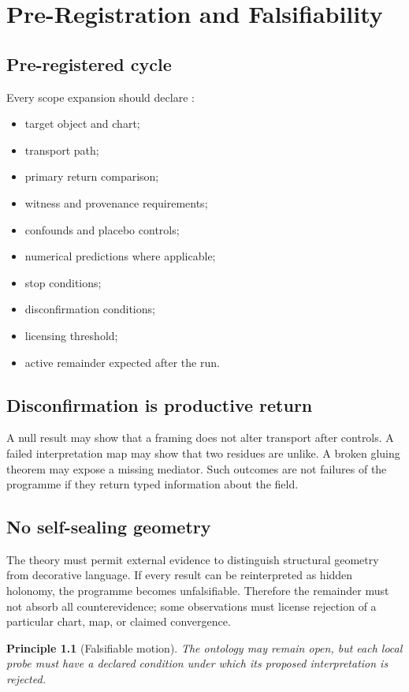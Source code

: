 \documentclass[12pt,openany]{book}
\newtheorem{principle}[definition]{Principle}
\theoremstyle{remark}
\begin{document}
\chapter{Pre-Registration and Falsifiability}
\label{ch:prereg}

\section{Pre-registered cycle}
Every scope expansion should declare \cite{Nosek2018}:
\begin{itemize}
\item target object and chart;
\item transport path;
\item primary return comparison;
\item witness and provenance requirements;
\item confounds and placebo controls;
\item numerical predictions where applicable;
\item stop conditions;
\item disconfirmation conditions;
\item licensing threshold;
\item active remainder expected after the run.
\end{itemize}

\section{Disconfirmation is productive return}
A null result may show that a framing does not alter transport after controls. A failed interpretation map may show that two residues are unlike. A broken gluing theorem may expose a missing mediator. Such outcomes are not failures of the programme if they return typed information about the field.

\section{No self-sealing geometry}
The theory must permit external evidence to distinguish structural geometry from decorative language. If every result can be reinterpreted as hidden holonomy, the programme becomes unfalsifiable. Therefore the remainder must not absorb all counterevidence; some observations must license rejection of a particular chart, map, or claimed convergence.

\begin{principle}[Falsifiable motion]
The ontology may remain open, but each local probe must have a declared condition under which its proposed interpretation is rejected.
\end{principle}
\end{document}

